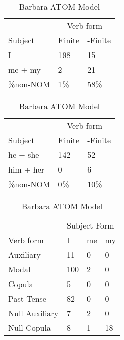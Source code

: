 \begin{table}[]
    \caption{Barbara ATOM Model}
\begin{minipage}{0.5\textwidth}
    \centering
    \begin{tabular}{@{}lll@{}}
        \toprule
         &\multicolumn{2}{c}{Verb form}\\
         \cline{2-3}
        Subject & Finite & -Finite \\
        \midrule
        I & 198 & 15 \\
        me + my & 2 & 21 \\
        \hline
        \%non-NOM & 1\% & 58\% \\
        \bottomrule
    \end{tabular}
\end{minipage}
\begin{minipage}{0.5\textwidth}
    \centering
    \begin{tabular}{@{}lll@{}}
        \toprule
         &\multicolumn{2}{c}{Verb form}\\
         \cline{2-3}
        Subject & Finite & -Finite \\
        \midrule
        he + she & 142 & 52 \\
        him + her & 0 & 6 \\
        \hline
        \%non-NOM & 0\% & 10\% \\
        \bottomrule
    \end{tabular}
    \end{minipage}
    \begin{minipage}{0.5\textwidth}
    \centering
    \begin{tabular}{@{}llll@{}}
        \toprule
            &\multicolumn{3}{l}{Subject Form}\\
            \cline{2-4}
        Verb form & I & me & my \\
        \midrule
        Auxiliary & 11 & 0 & 0 \\
        Modal & 100 & 2 & 0 \\
        Copula & 5 & 0 & 0 \\
        Past Tense & 82 & 0 & 0 \\
        \hline
        Null Auxiliary & 7 & 2 & 0 \\
        Null Copula & 8 & 1 & 18 \\
        \bottomrule
    \end{tabular}

\end{minipage}
\end{table}

